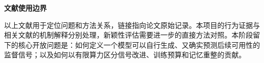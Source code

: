 \documentclass[11pt,a4paper]{article}
\begin{document}
\vspace{5mm}
\noindent\textbf{文献使用边界}\par
以上文献用于定位问题和方法关系，链接指向论文原始记录。本项目的行为证据与相关文献的机制解释分别处理，新颖性评估需要进一步的直接方法对照。本阶段留下的核心开放问题是：如何定义一个模型可以自行生成、又确实预测后续可用性的监督信号；以及如何以有限算力区分信号改进、训练预算和记忆重整的贡献。
\vfill
{}
\end{document}
